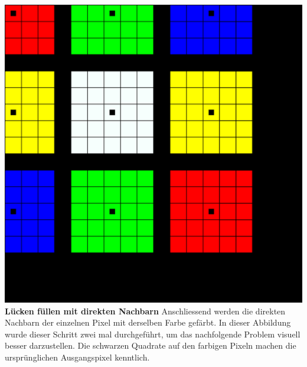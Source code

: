\documentclass[course=erap]{aspdoc}
\begin{document}
\centering
\includegraphics[scale=0.27]{"3x3_6_zoomed_nachbarn_2"}
\justify
\textbf{Lücken füllen mit direkten Nachbarn}\hspace{0.5cm} Anschliessend werden die direkten Nachbarn der einzelnen Pixel mit derselben Farbe gefärbt. In dieser Abbildung wurde dieser Schritt zwei mal durchgeführt, um das nachfolgende Problem visuell besser darzustellen. Die schwarzen Quadrate auf den farbigen Pixeln machen die ursprünglichen Ausgangspixel kenntlich.\\
\end{document}

